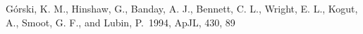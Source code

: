 \documentclass{emulateapj}
\begin{document}
%
%






\begin{acknowledgements}

\end{acknowledgements}

\begin{thebibliography}{}

 G{\'o}rski, K. M.,
  Hinshaw, G., Banday, A. J., Bennett, C. L., Wright, E. L., Kogut,
  A., Smoot, G. F., and Lubin, P.\ 1994, ApJL, 430, 89

\end{thebibliography}
\end{document}
